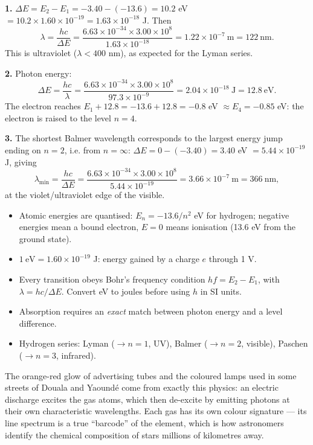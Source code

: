 \documentclass[11pt]{article}
\begin{document}
\begin{corrige}[Exercise 1]
\textbf{1.} $\Delta E = E_2 - E_1 = -3.40-(-13.6) = 10.2$ eV $= 10.2\times 1.60\times 10^{-19} = 1.63\times 10^{-18}$ J. Then
\[
\lambda = \frac{hc}{\Delta E} = \frac{6.63\times 10^{-34}\times 3.00\times 10^{8}}{1.63\times 10^{-18}} = 1.22\times 10^{-7}\ \text{m} = 122\ \text{nm}.
\]
This is ultraviolet ($\lambda < 400$ nm), as expected for the Lyman series.

\textbf{2.} Photon energy:
\[
\Delta E = \frac{hc}{\lambda} = \frac{6.63\times 10^{-34}\times 3.00\times 10^{8}}{97.3\times 10^{-9}} = 2.04\times 10^{-18}\ \text{J} = 12.8\ \text{eV}.
\]
The electron reaches $E_1 + 12.8 = -13.6 + 12.8 = -0.8$ eV $\approx E_4 = -0.85$ eV: the electron is raised to the level $n=4$.

\textbf{3.} The shortest Balmer wavelength corresponds to the largest energy jump ending on $n=2$, i.e. from $n=\infty$: $\Delta E = 0-(-3.40) = 3.40$ eV $= 5.44\times 10^{-19}$ J, giving
\[
\lambda_{\min} = \frac{hc}{\Delta E} = \frac{6.63\times 10^{-34}\times 3.00\times 10^{8}}{5.44\times 10^{-19}} = 3.66\times 10^{-7}\ \text{m} = 366\ \text{nm},
\]
at the violet/ultraviolet edge of the visible.
\end{corrige}

\begin{aretenir}
\begin{itemize}
\item Atomic energies are quantised: $E_n = -13.6/n^2$ eV for hydrogen; negative energies mean a bound electron, $E=0$ means ionisation (13.6 eV from the ground state).
\item $1\ \text{eV} = 1.60\times 10^{-19}$ J: energy gained by a charge $e$ through 1 V.
\item Every transition obeys Bohr's frequency condition $hf = E_2 - E_1$, with $\lambda = hc/\Delta E$. Convert eV to joules before using $h$ in SI units.
\item Absorption requires an \emph{exact} match between photon energy and a level difference.
\item Hydrogen series: Lyman ($\to n=1$, UV), Balmer ($\to n=2$, visible), Paschen ($\to n=3$, infrared).
\end{itemize}
\end{aretenir}

\begin{savaistu}
The orange-red glow of advertising tubes and the coloured lamps used in some streets of Douala and Yaoundé come from exactly this physics: an electric discharge excites the gas atoms, which then de-excite by emitting photons at their own characteristic wavelengths. Each gas has its own colour signature — its line spectrum is a true ``barcode'' of the element, which is how astronomers identify the chemical composition of stars millions of kilometres away.
\end{savaistu}
\end{document}
